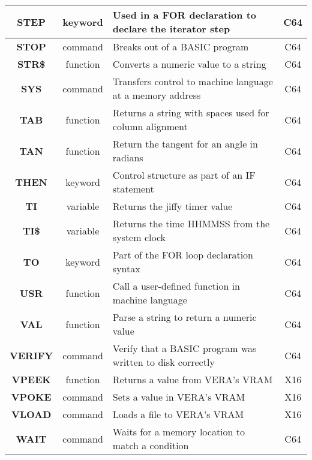 \begin{longtable}{|c|c|m{4cm}|c|}
	{\bfseries STEP} & keyword & Used in a {\ttfamily FOR} declaration to declare the iterator step & C64 \\ \hline
	{\bfseries STOP} & command & Breaks out of a BASIC program & C64 \\ \hline
	{\bfseries STR\$} & function & Converts a numeric value to a string & C64 \\ \hline
	{\bfseries SYS} & command & Transfers control to machine language at a memory address & C64 \\ \hline
	{\bfseries TAB} & function & Returns a string with spaces used for column alignment & C64 \\ \hline
	{\bfseries TAN} & function & Return the tangent for an angle in radians & C64 \\ \hline
	{\bfseries THEN} & keyword & Control structure as part of an {\ttfamily IF} statement & C64 \\ \hline
	{\bfseries TI} & variable & Returns the jiffy timer value & C64 \\ \hline
	{\bfseries TI\$} & variable & Returns the time HHMMSS from the system clock & C64 \\ \hline
	{\bfseries TO} & keyword & Part of the {\ttfamily FOR} loop declaration syntax & C64 \\ \hline
	{\bfseries USR} & function & Call a user-defined function in machine language & C64 \\ \hline
	{\bfseries VAL} & function & Parse a string to return a numeric value & C64 \\ \hline
	{\bfseries VERIFY} & command & Verify that a BASIC program was written to disk correctly & C64 \\ \hline
	{\bfseries VPEEK} & function & Returns a value from VERA's VRAM & X16 \\ \hline
	{\bfseries VPOKE} & command & Sets a value in VERA's VRAM & X16 \\ \hline
	{\bfseries VLOAD} & command & Loads a file to VERA's VRAM & X16 \\ \hline
	{\bfseries WAIT} & command & Waits for a memory location to match a condition & C64 \\ \hline
\end{longtable}
